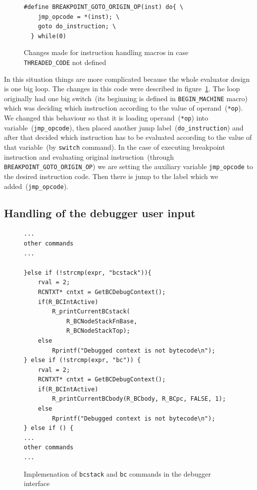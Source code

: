 \documentclass[thesis=M,english]{FITthesis}[2018/10/20]
\newcommand{\code}[1]{\texttt{#1}}
\begin{document}
{\begin{figure}[h]
\begin{lstlisting}
#define BREAKPOINT_GOTO_ORIGIN_OP(inst) do{ \
    jmp_opcode = *(inst); \
    goto do_instruction; \
  } while(0)
\end{lstlisting}
	\caption{Changes made for instruction handling macros in case \code{THREADED{\_}CODE} not defined}\label{fig:instruction-handling-not-threaded}
\end{figure}

In this situation things are more complicated because the whole evaluator design is one big loop. The changes in this code were described in figure~\ref{fig:instruction-handling-not-threaded}. The loop originally had  one big switch~(its beginning is defined in \code{BEGIN{\_}MACHINE} macro) which was deciding which instruction according to the value of operand~(\code{*op}). We changed this behaviour so that it is loading operand~(\code{*op}) into variable~(\code{jmp{\_}opcode}), then placed another jump label~(\code{do{\_}instruction}) and after that decided which instruction has to be evaluated according to the value of that variable~(by \code{switch} command). In the case of executing breakpoint instruction and evaluating original instruction~(through \code{BREAKPOINT{\_}GOTO{\_}ORIGIN{\_}OP}) we are setting the auxiliary variable \code{jmp{\_}opcode} to the desired instruction code. Then there is jump to the label which we added~(\code{jmp{\_}opcode}).

\subsection{Handling of the debugger user input}\label{handling-debugger-user-input}

\begin{figure}[h]
\begin{lstlisting}
...
other commands
...

}else if (!strcmp(expr, "bcstack")){
    rval = 2;
    RCNTXT* cntxt = GetBCDebugContext();
    if(R_BCIntActive)
        R_printCurrentBCstack(
            R_BCNodeStackFnBase, 
            R_BCNodeStackTop);
    else
        Rprintf("Debugged context is not bytecode\n");
} else if (!strcmp(expr, "bc")) {
    rval = 2;
    RCNTXT* cntxt = GetBCDebugContext();
    if(R_BCIntActive)
        R_printCurrentBCbody(R_BCbody, R_BCpc, FALSE, 1);
    else
        Rprintf("Debugged context is not bytecode\n");
} else if () {
...
other commands
...
\end{lstlisting}
	\caption{Implemenation of \code{bcstack} and \code{bc} commands in the debugger interface}\label{fig:implementation-of-bcstack-bc-commands}
\end{figure}

}
\end{document}
